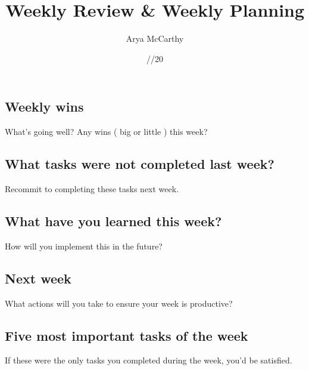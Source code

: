 \documentclass[11pt, oneside, twocolumn]{article}   	%
\title{Weekly Review \& Weekly Planning}
\author{Arya McCarthy}
\date{\underline{\hspace{2ex}}/\underline{\hspace{2ex}}/20\underline{\hspace{2ex}}}							%
\begin{document}
\maketitle
\subsection*{Weekly wins}
\vspace{-0.9em}
{\footnotesize What's going well? Any wins ( big or little ) this week?}

\hrulefill

\hrulefill

\hrulefill

\hrulefill

\subsection*{What tasks were not completed last week?}
\vspace{-0.9em}
{\footnotesize Recommit to completing these tasks next week.}

\hrulefill

\hrulefill

\hrulefill

\hrulefill

\hrulefill

\hrulefill


\subsection*{What have you learned this week?}
\vspace{-0.9em}
{\footnotesize How will you implement this in the future?}

\hrulefill

\hrulefill

\hrulefill


\subsection*{Next week}
\vspace{-0.9em}
{\footnotesize What actions will you take to ensure your week is productive?}

\hrulefill

\hrulefill

\hrulefill

\newpage

\subsection*{Five most important tasks of the week}
\vspace{-0.9em}
{\footnotesize If these were the only tasks you completed during the week, you'd be satisfied.}
\end{document}

